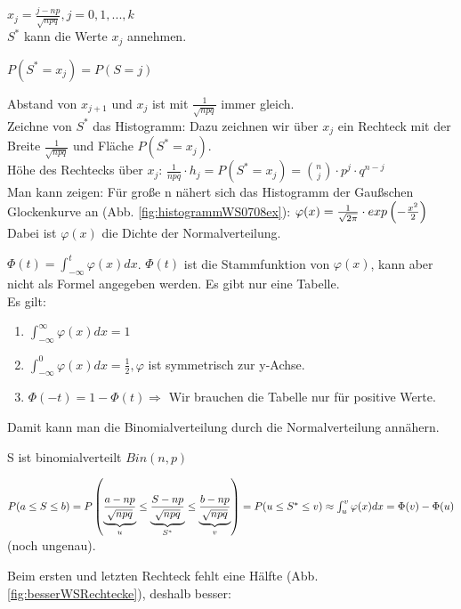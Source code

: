 $ x_j = \frac{j - np}{\sqrt{npq}}, j=0,1,...,k $\\

$ S^* $ kann die Werte $x_j$ annehmen. 

$ P (S^* = x_j) = P(S=j) $

Abstand von $x_{j+1}$ und $x_j$ ist mit $\frac{1}{\sqrt{npq}}$ immer gleich. \\

Zeichne von $S^*$ das Histogramm: Dazu zeichnen wir über $x_j$ ein Rechteck mit der Breite $\frac{1}{\sqrt{npq}}$ und Fläche $P(S^* = x_j) $.\\

Höhe des Rechtecks über $x_j$: $ \frac{1}{npq} \cdot h_j = P(S^* = x_j) = \binom n j \cdot p^j \cdot q^{n-j} $\\

Man kann zeigen: Für große n nähert sich das Histogramm der Gaußschen Glockenkurve an (Abb. \ref{fig:histogrammWS0708ex}):
$ \varphi(x) = \frac{1}{\sqrt{2\pi}} \cdot exp \left( -\frac{x^2}{2} \right) $ Dabei ist $\varphi(x) $ die Dichte der Normalverteilung. 

$ \Phi(t) = \int_{-\infty}^{t} \varphi(x) dx$. $ \Phi(t)$ ist die Stammfunktion von $\varphi(x)$, kann aber nicht als Formel angegeben werden. Es gibt nur eine Tabelle. \\

Es gilt:
\begin{enumerate}
\item $ \int_{-\infty}^{\infty} \varphi(x) dx = 1$
\item $ \int_{-\infty}^{0} \varphi(x) dx = \frac{1}{2}, \varphi$ ist symmetrisch zur y-Achse.
\item $ \Phi(-t) = 1 - \Phi(t) \Rightarrow $ Wir brauchen die Tabelle nur für positive Werte. 
\end{enumerate} 

Damit kann man die Binomialverteilung durch die Normalverteilung annähern. 

S ist binomialverteilt $Bin(n,p)$

$ P(a \leq S \leq b) 
= P  \left( \underbrace{\frac{a-np}{\sqrt{npq}}}_{u} \leq \underbrace{\frac{S-np}{\sqrt{npq}}}_{S^*} \leq \underbrace{\frac{b-np}{\sqrt{npq}}}_{v} \right) 
= P( u\leq S^* \leq v)
\approx \int_{u}^{v} \varphi(x) dx = \Phi(v) - \Phi(u) 
$ (noch ungenau).

Beim ersten und letzten Rechteck fehlt eine Hälfte (Abb. \ref{fig:besserWSRechtecke}), deshalb besser: 

